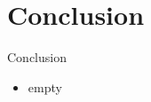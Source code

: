 \section{Conclusion}
\begin{frame}{Conclusion}

	\begin{minipage}[c][4cm]{\textwidth}
		\begin{itemize}\itemfill
			\item empty
		\end{itemize}
	\end{minipage}
	
\end{frame}
